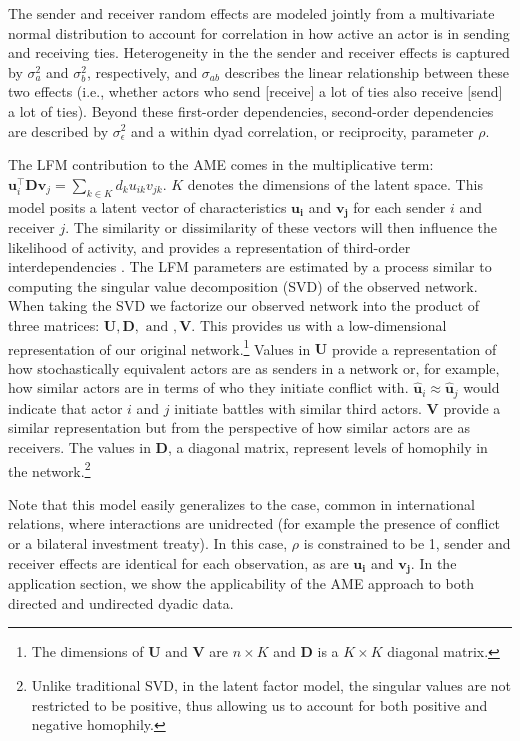 The sender and receiver random effects are modeled jointly from a multivariate normal distribution to account for correlation in how active an actor is in sending and receiving ties. Heterogeneity in the the sender and receiver effects is captured by $\sigma_{a}^{2}$ and $\sigma_{b}^{2}$, respectively, and $\sigma_{ab}$ describes the linear relationship between these two effects (i.e., whether actors who send [receive] a lot of ties also receive [send] a lot of ties). Beyond these first-order dependencies, second-order dependencies are described by $\sigma_{\epsilon}^{2}$ and a within dyad correlation, or reciprocity, parameter $\rho$.

The LFM contribution to the AME comes in the multiplicative term: $\mathbf{u}_{i}^{\top} \mathbf{D} \mathbf{v}_{j}=\sum_{k \in K} d_{k} u_{ik} v_{jk}$. $K$ denotes the dimensions of the latent space. This model posits a latent vector of characteristics $\mathbf{u_{i}}$ and $\mathbf{v_{j}}$ for each sender $i$ and receiver $j$. The similarity or dissimilarity of these vectors will then influence the likelihood of activity, and provides a representation of third-order interdependencies \citep{minhas:etal:2016:arxiv}. The LFM parameters are estimated by a process similar to computing the singular value decomposition (SVD) of the observed network. When taking the SVD we factorize our observed network into the product of three matrices: $\mathbf{U}, \mathbf{D}, \text{ and }, \mathbf{V}$. This provides us with a low-dimensional representation of our original network.\footnote{The dimensions of $\mathbf{U}$ and $\mathbf{V}$ are $n \times K$ and $\mathbf{D}$ is a $K \times K$ diagonal matrix.} Values in $\mathbf{U}$ provide a representation of how stochastically equivalent actors are as senders in a network or, for example, how similar actors are in terms of who they initiate conflict with. $\hat{\mathbf{u}}_{i} \approx \hat{\mathbf{u}}_{j}$ would indicate that actor $i$ and $j$ initiate battles with similar third actors. $\mathbf{V}$ provide a similar representation but from the perspective of how similar actors are as receivers. The values in $\mathbf{D}$, a diagonal matrix, represent levels of homophily in the network.\footnote{Unlike traditional SVD, in the latent factor model, the singular values are not restricted to be positive, thus allowing us to account for both positive and negative homophily.}

Note that this model easily generalizes to the case, common in international relations, where interactions are unidrected (for example the presence of conflict or a bilateral investment treaty). In this case, $\rho$ is constrained to be 1, sender and receiver effects are identical for each observation, as are $\mathbf{u_{i}}$ and $\mathbf{v_{j}}$. In the application section, we show the applicability of the AME approach to both directed and undirected dyadic data.

